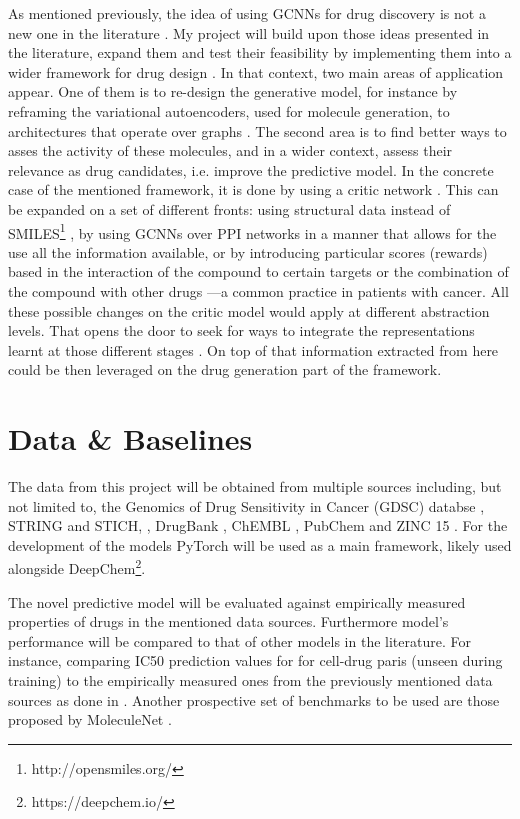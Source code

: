 \documentclass{article}
\begin{document}
As mentioned previously, the idea of using GCNNs for drug discovery is not a new one in
the literature \cite{Sun2019}. My project will build upon those ideas presented in the
literature, expand them and test their feasibility by implementing them into a wider
framework for drug design \cite{Born2019}. In that context, two main areas of
application appear. One of them is to re-design the generative model, for instance by
reframing the variational autoencoders, used for molecule generation, to architectures
that operate over graphs \cite{Simonovsky2018,Li2018, Li2018a}. The second area is to
find better ways to asses the activity of these molecules, and in a wider context,
assess their relevance as drug candidates, i.e. improve the predictive model. In the
concrete case of the mentioned framework, it is done by using a critic network
\cite{Manica2019}. This can be expanded on a set of different fronts: using structural
data instead of SMILES\footnote{http://opensmiles.org/} \cite{Li, Do2019}, by using
GCNNs over PPI networks in a manner that allows for the use all the information
available\cite{Oskooei2019, Wang2019}, or by introducing particular scores (rewards)
based in the interaction of the compound to certain targets \cite{YingkaiGao2018,
Zhavoronkov2019} or the combination of the compound with other drugs
\cite{Zitnik2018}---a common practice in patients with cancer. All these possible
changes on the critic model would apply at different abstraction levels. That opens the
door to seek for ways to integrate the representations learnt at those different stages
\cite{Ying2018, Ma2019, Huang2019}. On top of that information extracted from here could
be then leveraged on the drug generation part of the framework.


    \section*{Data \& Baselines}

The data from this project will be obtained from multiple sources including, but not
limited to, the Genomics of Drug Sensitivity in Cancer (GDSC) databse \cite{Yang2013},
STRING and STICH, \cite{Szklarczyk2019,Szklarczyk2016}, DrugBank \cite{Wishart2006},
ChEMBL \cite{Gaulton2017}, PubChem \cite{Kim2019} and ZINC 15 \cite{Sterling2015}. For
the development of the models PyTorch \cite{Paszke2019} will be used as a main
framework, likely used alongside DeepChem\footnote{https://deepchem.io/}.

The novel predictive model will be evaluated against empirically measured properties of
drugs in the mentioned data sources. Furthermore model's performance will be compared to
that of other models in the literature. For instance, comparing IC50 prediction values
for for cell-drug paris (unseen during training) to the empirically measured ones from
the previously mentioned data sources as done in \cite{Oskooei2019, Joo2019,
Oskooei2018}. Another prospective set of benchmarks to be used are those proposed by
MoleculeNet \cite{Wu2018}.
\end{document}
